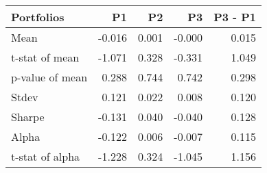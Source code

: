 \begin{tabular}{lrrrr}
\toprule
Portfolios & P1 & P2 & P3 & P3 - P1 \\
\midrule
Mean & -0.016 & 0.001 & -0.000 & 0.015 \\
t-stat of mean & -1.071 & 0.328 & -0.331 & 1.049 \\
p-value of mean & 0.288 & 0.744 & 0.742 & 0.298 \\
Stdev & 0.121 & 0.022 & 0.008 & 0.120 \\
Sharpe & -0.131 & 0.040 & -0.040 & 0.128 \\
Alpha & -0.122 & 0.006 & -0.007 & 0.115 \\
t-stat of alpha & -1.228 & 0.324 & -1.045 & 1.156 \\
\bottomrule
\end{tabular}
